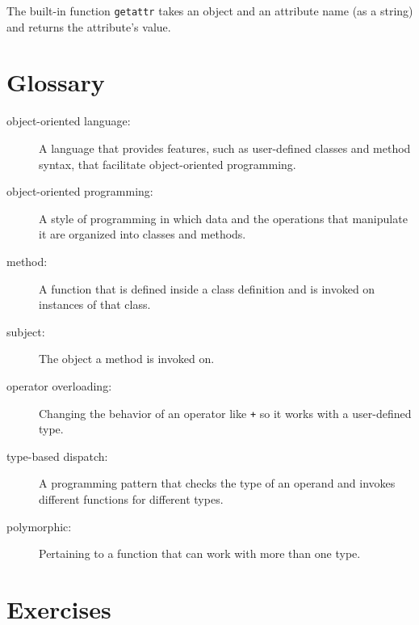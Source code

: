 \documentclass[10pt]{book}
\begin{document}
{

The built-in function {\tt getattr} takes an object and an attribute
name (as a string) and returns the attribute's value.



\section{Glossary}

\begin{description}

\item[object-oriented language:] A language that provides features,
  such as user-defined classes and method syntax, that facilitate
  object-oriented programming.

\item[object-oriented programming:] A style of programming in which
data and the operations that manipulate it are organized into classes
and methods.

\item[method:] A function that is defined inside a class definition and
is invoked on instances of that class.

\item[subject:] The object a method is invoked on.

\item[operator overloading:] Changing the behavior of an operator like
{\tt +} so it works with a user-defined type.

\item[type-based dispatch:] A programming pattern that checks the type
of an operand and invokes different functions for different types.

\item[polymorphic:] Pertaining to a function that can work with more
  than one type.  


\end{description}

\section{Exercises}

}
\end{document}
